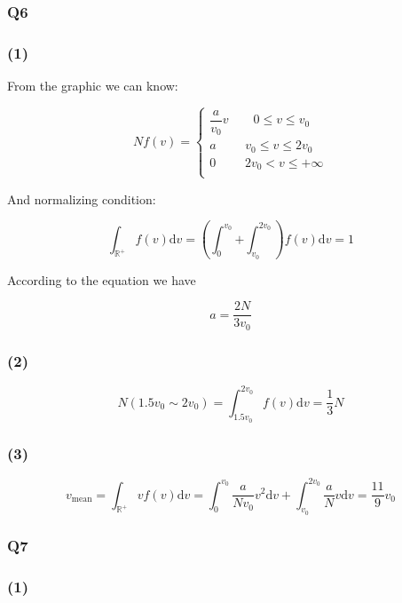 \documentclass[a4paper,11pt]{amsart}
\theoremstyle{definition}
\begin{document}
    \subsubsection*{Q6}
	
	\subsubsection*{(1)}
	
	From the graphic we can know:
	
	$$
	Nf\left( v \right) =\begin{cases}
		\dfrac{a}{v_0}v\qquad 0\leqslant v\leqslant v_0\\
		a\qquad \,\,   v_0\leqslant v\leqslant 2v_0\\
		0\qquad \,\, 2v_0<v\leqslant +\infty\\
	\end{cases}
	$$
	
	And normalizing condition:
	
	$$
	\int_{\mathbb{R} ^+}{f\left( v \right) \mathrm{d}v=\left( \int_0^{v_0}{+\int_{v_0}^{2v_0}} \right)}f\left( v \right) \mathrm{d}v=1
	$$
	
	According to the equation we have
	
	$$
	a=\dfrac{2N}{3v_0}
	$$
	
	\subsubsection*{(2)}
	
	$$
	N(1.5v_0\sim2v_0)=\int_{1.5v_0}^{2v_0}f(v)\mathrm{d}v=\dfrac{1}{3}N
	$$
	
	\subsubsection*{(3)}
	
	$$
	v_{\mathrm{mean}}=\int_{\mathbb{R} ^+}{vf\left( v \right) \mathrm{d}v=}\int_0^{v_0}{\frac{a}{Nv_0}v^2\mathrm{d}v+\int_{v_0}^{2v_0}{\frac{a}{N}v\mathrm{d}v=}}\frac{11}{9}v_0
	$$
	
    \subsubsection*{Q7}

	\subsubsection*{(1)}
	
\end{document}
